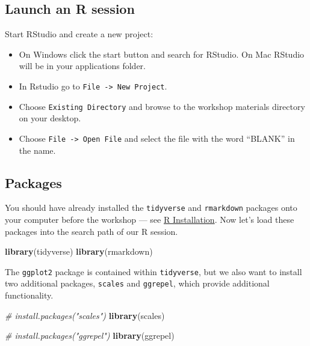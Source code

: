 \documentclass[
]{book}
\newenvironment{Shaded}{\begin{snugshade}}{\end{snugshade}}
\newcommand{\CommentTok}[1]{\textcolor[rgb]{0.56,0.35,0.01}{\textit{#1}}}
\newcommand{\KeywordTok}[1]{\textcolor[rgb]{0.13,0.29,0.53}{\textbf{#1}}}
\newcommand{\NormalTok}[1]{#1}
\providecommand{\tightlist}{%
  \setlength{\itemsep}{0pt}\setlength{\parskip}{0pt}}
\begin{document}
\hypertarget{launch-an-r-session-1}{%
\subsection{Launch an R session}\label{launch-an-r-session-1}}

Start RStudio and create a new project:

\begin{itemize}
\tightlist
\item
  On Windows click the start button and search for RStudio. On Mac RStudio will be in your applications folder.
\item
  In Rstudio go to \texttt{File\ -\textgreater{}\ New\ Project}.
\item
  Choose \texttt{Existing\ Directory} and browse to the workshop materials directory on your desktop.
\item
  Choose \texttt{File\ -\textgreater{}\ Open\ File} and select the file with the word ``BLANK'' in the name.
\end{itemize}

\hypertarget{packages-1}{%
\subsection{Packages}\label{packages-1}}

You should have already installed the \texttt{tidyverse} and \texttt{rmarkdown} packages onto your computer before the workshop --- see \href{./Rinstall.html}{R Installation}. Now let's load these packages into the search path of our R session.

\begin{Shaded}
\begin{Highlighting}[]
\KeywordTok{library}\NormalTok{(tidyverse)}
\KeywordTok{library}\NormalTok{(rmarkdown)}
\end{Highlighting}
\end{Shaded}

The \texttt{ggplot2} package is contained within \texttt{tidyverse}, but we also want to install two additional packages, \texttt{scales} and \texttt{ggrepel}, which provide additional functionality.

\begin{Shaded}
\begin{Highlighting}[]
\CommentTok{\# install.packages("scales")}
\KeywordTok{library}\NormalTok{(scales)}

\CommentTok{\# install.packages("ggrepel") }
\KeywordTok{library}\NormalTok{(ggrepel)}
\end{Highlighting}
\end{Shaded}
\end{document}
